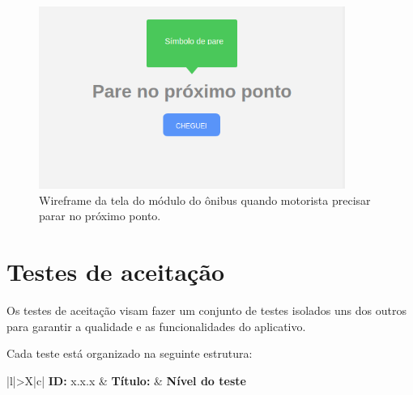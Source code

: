\documentclass[
	12pt,				%
	oneside,			%
	a4paper,			%
	brazil				%
]{abntex2}
\begin{document}
\begin{apendicesenv}
\begin{figure}[H]
\centering
\includegraphics[width=10cm, center]{images/busmodule-pare}
\caption{Wireframe da tela do módulo do ônibus quando motorista precisar parar no próximo ponto.}
\label{Rotulo}
\end{figure}

\chapter{Testes de aceitação}

Os testes de aceitação visam fazer um conjunto de testes isolados uns dos outros para garantir a qualidade e as funcionalidades do aplicativo.

Cada teste está organizado na seguinte estrutura:

\bgroup
\def\arraystretch{1.5}
\begin{table}[H]

\begin{tabularx}{\textwidth}{|l|>{\hsize}X|c|}
\hline 
\textbf{ID:} x.x.x & \textbf{Título:}  & \textbf{Nível do teste} \\ 
\hline 
{} \\ 
\hline  
{} \\ 
\hline 
{} \\ 
\hline 
{} \\ 
\hline 
{} \\ 
\hline 
\end{tabularx} 


\end{table}
\end{apendicesenv}
\end{document}
